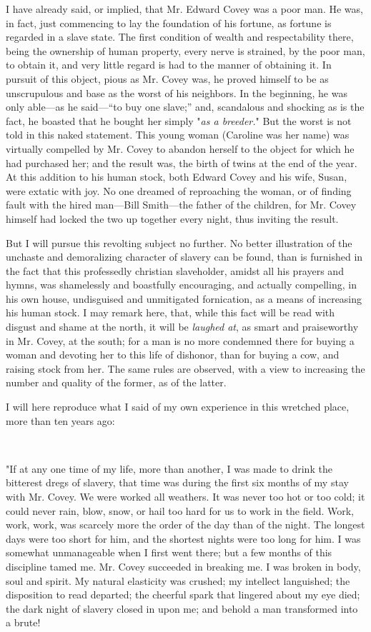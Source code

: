 I have already said, or implied, that Mr. Edward Covey was a poor man.
He was, in fact, just commencing to lay the foundation of his fortune,
as fortune is regarded in a slave state. The first condition of wealth
{}and respectability there, being the ownership of human property, every
nerve is strained, by the poor man, to obtain it, and very little regard
is had to the manner of obtaining it. In pursuit of this object, pious
as Mr. Covey was, he proved himself to be as unscrupulous and base as
the worst of his neighbors. In the beginning, he was only able---as he
said---``to buy one slave;'' and, scandalous and shocking as is the
fact, he boasted that he bought her simply "\emph{as a breeder.}" But
the worst is not told in this naked statement. This young woman
(Caroline was her name) was virtually compelled by Mr. Covey to abandon
herself to the object for which he had purchased her; and the result
was, the birth of twins at the end of the year. At this addition to his
human stock, both Edward Covey and his wife, Susan, were extatic with
joy. No one dreamed of reproaching the woman, or of finding fault with
the hired man---Bill Smith---the father of the children, for Mr. Covey
himself had locked the two up together every night, thus inviting the
result.

But I will pursue this revolting subject no further. No better
illustration of the unchaste and demoralizing character of slavery can
be found, than is furnished in the fact that this professedly christian
slaveholder, amidst all his prayers and hymns, was shamelessly and
boastfully encouraging, and actually compelling, in his own house,
undisguised and unmitigated fornication, as a means of increasing his
human stock. I may remark here, that, while this fact will be read with
disgust and shame at the north, it will be \emph{laughed at}, as smart
and praiseworthy in Mr. Covey, at the {}south; for a man is no more
condemned there for buying a woman and devoting her to this life of
dishonor, than for buying a cow, and raising stock from her. The same
rules are observed, with a view to increasing the number and quality of
the former, as of the latter.

I will here reproduce what I said of my own experience in this wretched
place, more than ten years ago:

~

"If at any one time of my life, more than another, I was made to drink
the bitterest dregs of slavery, that time was during the first six
months of my stay with Mr. Covey. We were worked all weathers. It was
never too hot or too cold; it could never rain, blow, snow, or hail too
hard for us to work in the field. Work, work, work, was scarcely more
the order of the day than of the night. The longest days were too short
for him, and the shortest nights were too long for him. I was somewhat
unmanageable when I first went there; but a few months of this
discipline tamed me. Mr. Covey succeeded in breaking me. I was broken in
body, soul and spirit. My natural elasticity was crushed; my intellect
languished; the disposition to read departed; the cheerful spark that
lingered about my eye died; the dark night of slavery closed in upon me;
and behold a man transformed into a brute!

